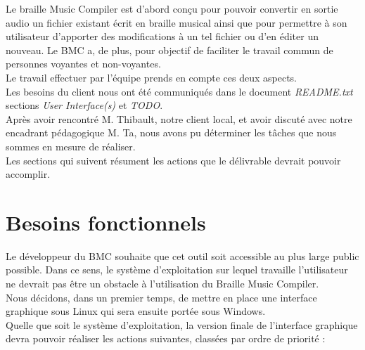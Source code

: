 
Le braille Music Compiler est d'abord conçu pour pouvoir convertir en sortie audio un fichier existant écrit en braille musical ainsi que pour permettre à son utilisateur d'apporter des modifications à un tel fichier ou d'en éditer un nouveau. Le BMC a, de plus, pour objectif de faciliter le travail commun de personnes voyantes et non-voyantes.\\
Le travail effectuer par l'équipe prends en compte ces deux aspects.\\  

Les besoins du client nous ont été communiqués dans le document \textit{README.txt} sections \textit{User Interface(s)} et \textit{TODO}.\\
Après avoir rencontré M. Thibault, notre client local, et avoir discuté avec notre encadrant pédagogique M. Ta, nous avons pu déterminer les tâches que nous sommes en mesure de réaliser. \\

Les sections qui suivent résument les actions que le délivrable devrait pouvoir accomplir. 


\section{Besoins fonctionnels}
Le développeur du BMC souhaite que cet outil soit accessible au plus large public possible. Dans ce sens, le système d'exploitation sur lequel travaille l'utilisateur ne devrait pas être un obstacle à l'utilisation du Braille Music Compiler.\\

Nous décidons, dans un premier temps, de mettre en place une interface graphique sous Linux qui sera ensuite portée sous Windows.\\
 
Quelle que soit le système d'exploitation, la version finale de l'interface graphique devra pouvoir réaliser les actions suivantes, classées par ordre de priorité : \\


